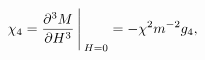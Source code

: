\begin{equation}
\chi_4 = {\partial^3M \over{\partial H^3}} \Bigg\arrowvert_{H = 0} 
= - \chi^2 m^{-2} g_4, \qquad \quad 
\label{eq:8} \\
\end{equation}

